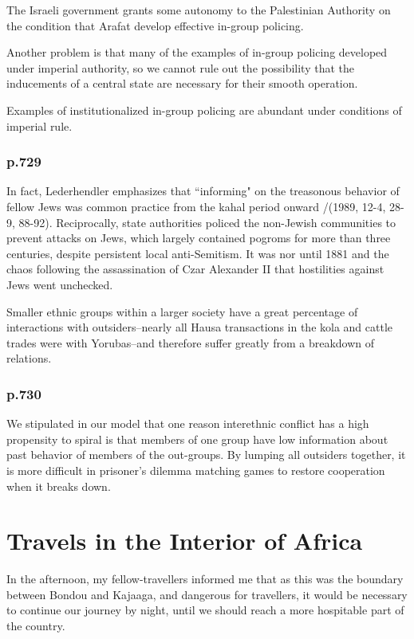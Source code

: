\documentclass[12pt]{article}
\begin{document}
The Israeli government grants some autonomy to the Palestinian Authority on the
condition that Arafat develop effective in-group policing.

Another problem is that many of the examples of in-group policing developed
under imperial authority, so we cannot rule out the possibility that the
inducements of a central state are necessary for their smooth operation.

Examples of institutionalized in-group policing are abundant under conditions of
imperial rule.

\subsubsection{p.729}

In fact, Lederhendler emphasizes that ``informing" on the treasonous behavior of
fellow Jews was common practice from the kahal period onward /(1989, 12-4, 28-9,
88-92). Reciprocally, state authorities policed the non-Jewish communities to
prevent attacks on Jews, which largely contained pogroms for more than three
centuries, despite persistent local anti-Semitism. It was nor until 1881 and the
chaos following the assassination of Czar Alexander II that hostilities against
Jews went unchecked.

Smaller ethnic groups within a larger society have a great percentage of
interactions with outsiders--nearly all Hausa transactions in the kola and
cattle trades were with Yorubas--and therefore suffer greatly from a breakdown
of relations.

\subsubsection{p.730}

We stipulated in our model that one reason interethnic conflict has a high
propensity to spiral is that members of one group have low information about
past behavior of members of the out-groups. By lumping all outsiders together,
it is more difficult in prisoner's dilemma matching games to restore cooperation
when it breaks down.

\section{Travels in the Interior of Africa \citep{ParkMungo2015Titi}}

In the afternoon, my fellow-travellers informed me that as this was the boundary
between Bondou and Kajaaga, and dangerous for travellers, it would be necessary
to continue our journey by night, until we should reach a more hospitable part
of the country.
\end{document}
